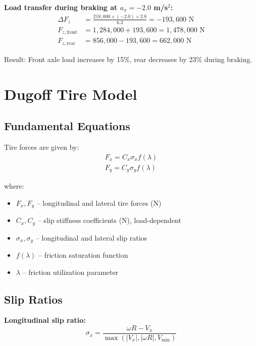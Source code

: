 \documentclass[11pt,a4paper]{article}
\begin{document}
\textbf{Load transfer during braking at $a_x = -2.0$ m/s$^2$:}
\begin{align}
\Delta F_z &= \frac{218{,}000 \times (-2.0) \times 2.8}{6.3} = -193{,}600 \text{ N} \\
F_{z,\text{front}} &= 1{,}284{,}000 + 193{,}600 = 1{,}478{,}000 \text{ N} \\
F_{z,\text{rear}} &= 856{,}000 - 193{,}600 = 662{,}000 \text{ N}
\end{align}

Result: Front axle load increases by 15\%, rear decreases by 23\% during braking.

\section{Dugoff Tire Model}
\label{sec:dugoff}

\subsection{Fundamental Equations}

Tire forces are given by:
\begin{align}
\boxed{F_x = C_x \sigma_x f(\lambda)} \label{eq:Fx_dugoff}\\
\boxed{F_y = C_y \sigma_y f(\lambda)} \label{eq:Fy_dugoff}
\end{align}

where:
\begin{itemize}
    \item $F_x, F_y$ -- longitudinal and lateral tire forces (N)
    \item $C_x, C_y$ -- slip stiffness coefficients (N), load-dependent
    \item $\sigma_x, \sigma_y$ -- longitudinal and lateral slip ratios
    \item $f(\lambda)$ -- friction saturation function
    \item $\lambda$ -- friction utilization parameter
\end{itemize}

\subsection{Slip Ratios}

\textbf{Longitudinal slip ratio:}
\begin{equation}
\boxed{\sigma_x = \frac{\omega R - V_x}{\max(|V_x|, |\omega R|, V_{\min})}}
\label{eq:slip_ratio}
\end{equation}
\end{document}
